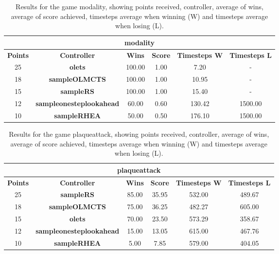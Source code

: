\begin{table*}[!t]
\begin{center}
\begin{tabular}{|c|c|c|c|c|c|}
\multicolumn{6}{c}{\textbf{modality}}\\
\hline
\textbf{Points} & \textbf{Controller} & \textbf{Wins} &  \textbf{Score} & \textbf{Timesteps W} & \textbf{Timesteps L}\\
\hline
25 & \textbf{olets} & 100.00 & 1.00 & 7.20 &  - 
 \\
\hline
18 & \textbf{sampleOLMCTS} & 100.00 & 1.00 & 10.95 &  - 
 \\
\hline
15 & \textbf{sampleRS} & 100.00 & 1.00 & 15.40 &  - 
 \\
\hline
12 & \textbf{sampleonesteplookahead} & 60.00 & 0.60 & 130.42 & 1500.00
 \\
\hline
10 & \textbf{sampleRHEA} & 50.00 & 0.50 & 176.10 & 1500.00
 \\
\hline
\end{tabular}
\caption{Results for the game modality, showing points received, controller, average of wins, average of score achieved, timesteps average when winning (W) and timesteps average when losing (L).}
\label{tab:weights}
\end{center}
\end{table*}
\begin{table*}[!t]
\begin{center}
\begin{tabular}{|c|c|c|c|c|c|}
\multicolumn{6}{c}{\textbf{plaqueattack}}\\
\hline
\textbf{Points} & \textbf{Controller} & \textbf{Wins} &  \textbf{Score} & \textbf{Timesteps W} & \textbf{Timesteps L}\\
\hline
25 & \textbf{sampleRS} & 85.00 & 35.95 & 532.00 & 489.67
 \\
\hline
18 & \textbf{sampleOLMCTS} & 75.00 & 36.25 & 482.27 & 605.00
 \\
\hline
15 & \textbf{olets} & 70.00 & 23.50 & 573.29 & 358.67
 \\
\hline
12 & \textbf{sampleonesteplookahead} & 15.00 & 13.05 & 615.00 & 467.76
 \\
\hline
10 & \textbf{sampleRHEA} & 5.00 & 7.85 & 579.00 & 404.05
 \\
\hline
\end{tabular}
\caption{Results for the game plaqueattack, showing points received, controller, average of wins, average of score achieved, timesteps average when winning (W) and timesteps average when losing (L).}
\label{tab:weights}
\end{center}
\end{table*}

